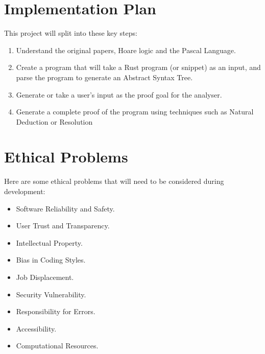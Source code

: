 \documentclass[11pt,a4paper]{article}
\begin{document}
\pagebreak
\section{Implementation Plan}
This project will split into these key steps:
\begin{enumerate}
    \item Understand the original papers, Hoare logic and the Pascal Language.
    \item Create a program that will take a Rust program (or snippet) as an input,
          and parse the program to generate an Abstract Syntax Tree.
    \item Generate or take a user's input as the proof goal for the analyser.
    \item Generate a complete proof of the program using techniques such as
          Natural Deduction or Resolution
\end{enumerate}

\pagebreak
\section{Ethical Problems}
Here are some ethical problems that will need to be considered during development:
\begin{itemize}
    \item Software Reliability and Safety.
    \item User Trust and Transparency.
    \item Intellectual Property.
    \item Bias in Coding Styles.
    \item Job Displacement.
    \item Security Vulnerability.
    \item Responsibility for Errors.
    \item Accessibility.
    \item Computational Resources.
\end{itemize}
\end{document}
